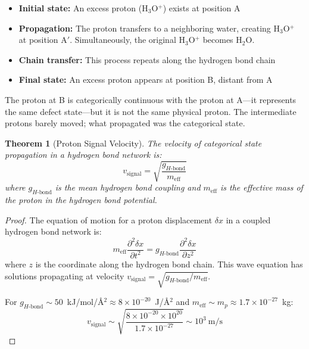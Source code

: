 \documentclass[twocolumn,showpacs,preprintnumbers,amsmath,amssymb,prd]{revtex4-2}
\newtheorem{theorem}{Theorem}[section]
\newcommand{\Hbond}{H\text{-bond}}
\begin{document}
\begin{itemize}
\item \textbf{Initial state:} An excess proton (H$_3$O$^+$) exists at position A
\item \textbf{Propagation:} The proton transfers to a neighboring water, creating H$_3$O$^+$ at position A$'$. Simultaneously, the original H$_3$O$^+$ becomes H$_2$O.
\item \textbf{Chain transfer:} This process repeats along the hydrogen bond chain
\item \textbf{Final state:} An excess proton appears at position B, distant from A
\end{itemize}

The proton at B is categorically continuous with the proton at A---it represents the same defect state---but it is not the same physical proton. The intermediate protons barely moved; what propagated was the categorical state.

\begin{theorem}[Proton Signal Velocity]
\label{thm:proton_signal}
The velocity of categorical state propagation in a hydrogen bond network is:
\begin{equation}
v_{\text{signal}} = \sqrt{\frac{g_{\Hbond}}{m_{\text{eff}}}}
\label{eq:proton_signal_velocity}
\end{equation}
where $g_{\Hbond}$ is the mean hydrogen bond coupling and $m_{\text{eff}}$ is the effective mass of the proton in the hydrogen bond potential.
\end{theorem}

\begin{proof}
The equation of motion for a proton displacement $\delta x$ in a coupled hydrogen bond network is:
\begin{equation}
m_{\text{eff}} \frac{\partial^2 \delta x}{\partial t^2} = g_{\Hbond} \frac{\partial^2 \delta x}{\partial z^2}
\label{eq:proton_wave}
\end{equation}
where $z$ is the coordinate along the hydrogen bond chain. This wave equation has solutions propagating at velocity $v_{\text{signal}} = \sqrt{g_{\Hbond}/m_{\text{eff}}}$.

For $g_{\Hbond} \sim 50$~kJ/mol/\AA$^2 \approx 8 \times 10^{-20}$~J/\AA$^2$ and $m_{\text{eff}} \sim m_p \approx 1.7 \times 10^{-27}$~kg:
\begin{equation}
v_{\text{signal}} \sim \sqrt{\frac{8 \times 10^{-20} \times 10^{20}}{1.7 \times 10^{-27}}} \sim 10^3~\text{m/s}
\end{equation}
\end{proof}
\end{document}
